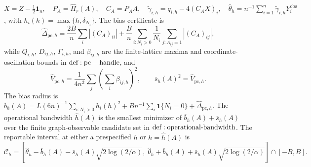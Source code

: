 \(X=Z-\tfrac12\mathbf1_n,\quad P_A=\widehat\Pi_r(A),\quad C_A=P_AA,\quad \widetilde\gamma_{i,h}=q_{i,h}-4(C_AX)_i,\quad \widehat\theta_h=n^{-1}\sum_{i=1}^n\widetilde\gamma_{i,h}Y_i^{\mathrm{obs}}\), with \(h_i(h)=\max\{h,\delta_{N_i}\}\).  The bias certificate is
\[
 \widehat\Delta_{\mathrm{pc},h}=\frac{2B}{n}\sum_i|(C_A)_{ii}|+\frac{B}{n}\sum_{i:N_i>0}\frac1{N_i}\sum_{j:A_{ij}=1}|(C_A)_{ij}|,
\]
while \(Q_{i,h}\), \(D_{ij,h}\), \(\Gamma_{i,h}\), and \(\beta_{ij,h}\) are the finite-lattice maxima and coordinate-oscillation bounds in \({\rm def:pc-handle}\), and
\[
 \widehat V_{\mathrm{pc},h}=\frac1{4n^2}\sum_j\left(\sum_i\beta_{ij,h}\right)^2,
 \qquad
 \overline s_h(A)^2=\widehat V_{\mathrm{pc},h}.
\]
The bias radius is \(\overline b_h(A)=L(6n)^{-1}\sum_{i:N_i>0}h_i(h)^2+Bn^{-1}\sum_i\mathbf1\{N_i=0\}+\widehat\Delta_{\mathrm{pc},h}\).  The operational bandwidth \(\widehat h(A)\) is the smallest minimizer of \(\overline b_h(A)+\overline s_h(A)\) over the finite graph-observable candidate set in \({\rm def:operational\text{-}bandwidth}\).  The reportable interval at either a prespecified \(h\) or \(h=\widehat h(A)\) is
\[
 \mathcal C_h=
 [\widehat\theta_h-\overline b_h(A)-\overline s_h(A)\sqrt{2\log(2/\alpha)},\;
  \widehat\theta_h+\overline b_h(A)+\overline s_h(A)\sqrt{2\log(2/\alpha)}]
 \cap[-B,B].
\]